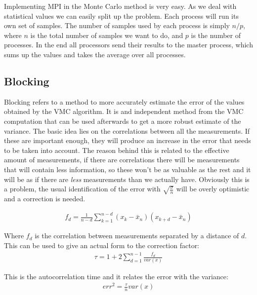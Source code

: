 		Implementing MPI in the Monte Carlo method is very easy. As we deal with statistical values we can easily split up the problem. Each process will run its own set of samples. The number of samples used by each process is simply $n/p$, where $n$ is the total number of samples we want to do, and $p$ is the number of processes. In the end all processors send their results to the master process, which sums up the values and takes the average over all processes.

	\subsection{Blocking}
	\label{sec:blocking}
		Blocking refers to a method to more accurately estimate the error of the values obtained by the VMC algorithm. It is and independent method from the VMC computation that can be used afterwards to get a more robust estimate of the variance. The basic idea lies on the correlations between all the measurements. If these are important enough, they will produce an increase in the error that needs to be taken into account. The reason behind this is related to the effective amount of measurements, if there are correlations there will be measurements that will contain less information, so these won't be as valuable as the rest and it will be as if there are \textit{less} measurements than we actually have. Obviously this is a problem, the usual identification of the error with $\sqrt{\frac{\sigma}{n}}$ will be overly optimistic and a correction is needed.

		\begin{align}
			f_d=\frac{1}{n-d}\sum_{k=1}^{n-d}{\left(x_k-\bar{x}_n\right)\left(x_{k+d}-\bar{x}_n\right)}
		\end{align}

		Where $f_d$ is the correlation between measurements separated by a distance of $d$. This can be used to give an actual form to the correction factor:\\

		\begin{align}
			\tau=1+2\sum_{d=1}^{n-1}{\frac{f_d}{var\left(x\right)}}
		\end{align}

		This is the autocorrelation time and it relates the error with the variance:\\

		\begin{align}
			err^2=\frac{\tau}{n}var\left(x\right)
		\end{align}

